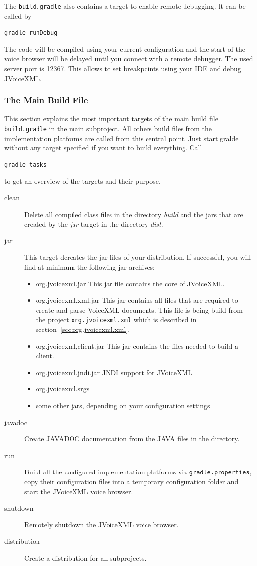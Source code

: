 \documentclass[11pt,a4paper]{article}
\begin{document}
The \texttt{build.gradle} also contains a target to enable remote
debugging. It can be called by
\begin{lstlisting}
gradle runDebug
\end{lstlisting}
The code will be compiled using your current configuration and the start of the
voice browser will be delayed until you connect with a remote debugger. The
used server port is 12367. This allows to set breakpoints using your IDE and
debug JVoiceXML.

\subsubsection{The Main Build File}
\label{sec:main-build-file}

This section explains the most important targets of the main build file
\texttt{build.gradle} in the main subproject. All others build files from the
implementation platforms
are called from this central point. Just start gralde without any target specified
if you want to build everything. Call
\begin{lstlisting}
gradle tasks
\end{lstlisting}
to get an overview of the targets and their purpose.

\begin{description}
\item[clean]
Delete all compiled class files in the directory \emph{build}
and the jars that are created by the \emph{jar} target in the directory 
\emph{dist}.

\item[jar]
This target dcreates the jar files of your distribution.
If successful, you will find at minimum the following jar archives:
\begin{itemize}
\item org.jvoicexml.jar This jar file contains the core of JVoiceXML.
\item org.jvoicexml.xml.jar This jar contains all files that are required
to create and parse VoiceXML documents. This file is being build from the
project \texttt{org.jvoicexml.xml} which is described in
section~\ref{sec:org.jvoicexml.xml}.
\item org.jvoicexml,client.jar This jar contains the files needed to build
a client.
\item org.jvoicexml.jndi.jar JNDI support for JVoiceXML
\item org.jvoicexml.srgs
\item some other jars, depending on your configuration settings
\end{itemize}

\item[javadoc]
Create JAVADOC documentation from the JAVA files in the directory.
\item[run] Build all the configured implementation platforms
via \texttt{gradle.properties}, copy their configuration files into a
temporary configuration folder and start the JVoiceXML voice browser.
\item[shutdown] Remotely shutdown the JVoiceXML voice browser.
\item[distribution] Create a distribution for all subprojects.
\end{description}
\end{document}

